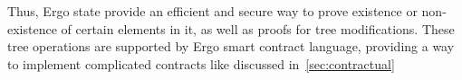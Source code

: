 Thus, Ergo state provide an efficient and secure way to prove existence or non-existence of certain elements in
it, as well as proofs for tree modifications.
These tree operations are supported by Ergo smart contract language, providing a way to implement complicated
contracts like discussed in~\ref{sec:contractual}





